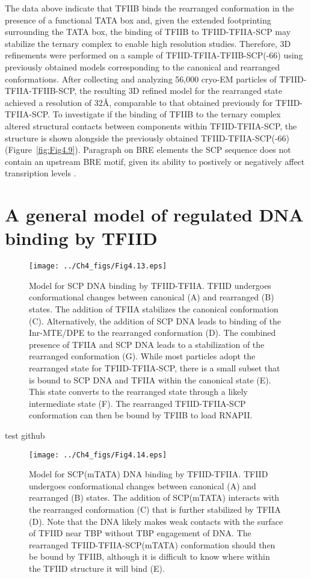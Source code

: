 \indent The data above indicate that TFIIB binds the rearranged conformation in the presence of a functional TATA box and, given the extended footprinting surrounding the TATA box, the binding of TFIIB to TFIID-TFIIA-SCP may stabilize the ternary complex to enable high resolution studies. Therefore, 3D refinements were performed on a sample of TFIID-TFIIA-TFIIB-SCP(-66) using previously obtained models corresponding to the canonical and rearranged conformations. After collecting and analyzing 56,000 cryo-EM particles of TFIID-TFIIA-TFIIB-SCP, the resulting 3D refined model for the rearranged state achieved a resolution of 32\AA, comparable to that obtained previously for TFIID-TFIIA-SCP. To investigate if the binding of TFIIB to the ternary complex altered structural contacts between components within TFIID-TFIIA-SCP, the structure is shown alongside the previously obtained TFIID-TFIIA-SCP(-66) (Figure~\ref{fig:Fig4.9}).
\indent Paragraph on BRE elements the SCP sequence does not contain an upstream BRE motif, given its ability to postively or negatively affect transription levels \cite{Deng_2005,Evans_2001,Lagrange_1998}. \\


\section{A general model of regulated DNA binding by TFIID}
\begin{figure}
\centering
\texttt{[image: ../Ch4\_figs/Fig4.13.eps]}
\caption[Model for SCP DNA binding by TFIID-TFIIA]{Model for SCP DNA binding by TFIID-TFIIA. TFIID undergoes conformational changes between canonical (A) and rearranged (B) states. The addition of TFIIA stabilizes the canonical conformation (C). Alternatively, the addition of SCP DNA leads to binding of the Inr-MTE/DPE to the rearranged conformation (D).  The combined presence of TFIIA and SCP DNA leads to a stabilization of the rearranged conformation (G).  While most particles adopt the rearranged state for TFIID-TFIIA-SCP, there is a small subset that is bound to SCP DNA and TFIIA within the canonical state (E). This state converts to the rearranged state through a likely intermediate state (F). The rearranged TFIID-TFIIA-SCP conformation can then be bound by TFIIB to load RNAPII.}
\label{fig:Fig4.13}
\end{figure}
test github
\begin{figure}
\centering
\texttt{[image: ../Ch4\_figs/Fig4.14.eps]}
\caption[Model for SCP(mTATA) DNA binding by TFIID-TFIIA]{Model for SCP(mTATA) DNA binding by TFIID-TFIIA. TFIID undergoes conformational changes between canonical (A) and rearranged (B) states. The addition of SCP(mTATA) interacts with the rearranged conformation (C) that is further stabilized by TFIIA (D). Note that the DNA likely makes weak contacts with the surface of TFIID near TBP without TBP engagement of DNA. The rearranged TFIID-TFIIA-SCP(mTATA) conformation should then be bound by TFIIB, although it is difficult to know where within the TFIID structure it will bind (E).}
\label{fig:Fig4.14}
\end{figure}
